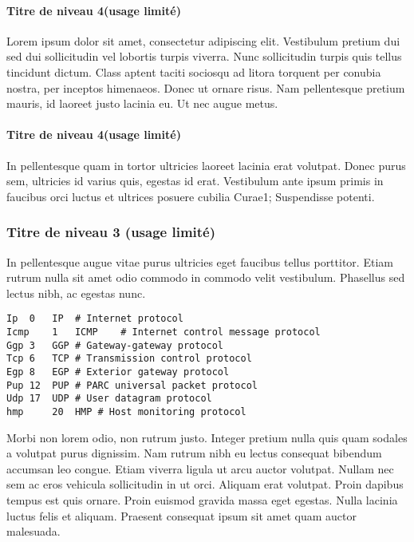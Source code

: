 \documentclass[year=2013]{jres}
\begin{document}
\paragraph{Titre de niveau 4(usage limité)}

Lorem ipsum dolor sit amet, consectetur adipiscing elit. Vestibulum pretium dui sed dui sollicitudin vel lobortis turpis viverra. 
Nunc sollicitudin turpis quis tellus tincidunt dictum. Class aptent taciti sociosqu ad litora torquent per conubia nostra, per inceptos himenaeos. Donec ut ornare risus. Nam pellentesque pretium mauris, id laoreet justo lacinia eu. Ut nec augue metus. 

\paragraph{Titre de niveau 4(usage limité)}

In pellentesque quam in tortor ultricies laoreet lacinia erat volutpat. Donec purus sem, ultricies id varius quis, egestas id erat. Vestibulum ante ipsum primis in faucibus orci luctus et ultrices posuere cubilia Curae1; Suspendisse potenti. 

\subsubsection{Titre de niveau 3 (usage limité)}

In pellentesque augue vitae purus ultricies eget faucibus tellus porttitor. Etiam rutrum nulla sit amet odio commodo in commodo velit vestibulum. Phasellus sed lectus nibh, ac egestas nunc.

\begin{lstlisting}
Ip	0	IP	# Internet protocol
Icmp	1	ICMP	# Internet control message protocol
Ggp	3	GGP	# Gateway-gateway protocol
Tcp	6	TCP	# Transmission control protocol
Egp	8	EGP	# Exterior gateway protocol
Pup	12	PUP	# PARC universal packet protocol
Udp	17	UDP	# User datagram protocol
hmp 	20	HMP	# Host monitoring protocol
\end{lstlisting}

Morbi non lorem odio, non rutrum justo. Integer pretium nulla quis quam sodales a volutpat purus dignissim. Nam rutrum nibh eu lectus consequat bibendum accumsan leo congue. Etiam viverra ligula ut arcu auctor volutpat. Nullam nec sem ac eros vehicula sollicitudin in ut orci. Aliquam erat volutpat. Proin dapibus tempus est quis ornare. Proin euismod gravida massa eget egestas. Nulla lacinia luctus felis et aliquam. Praesent consequat ipsum sit amet quam auctor malesuada.
\end{document}
